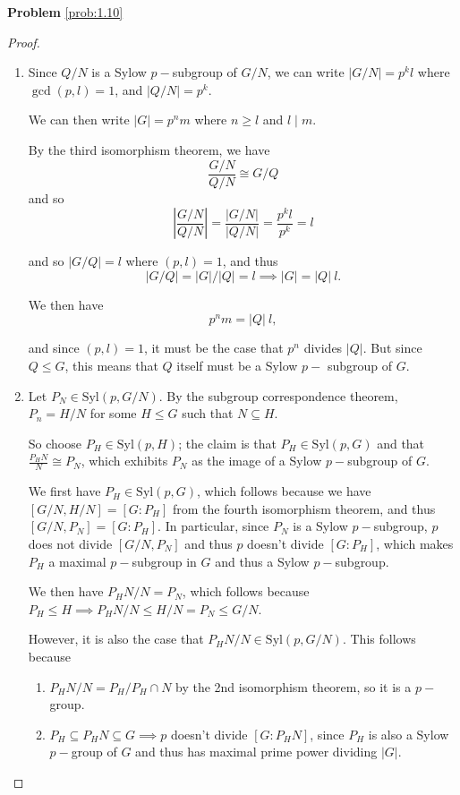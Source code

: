 \textbf{Problem} \ref{prob:1.10}
\begin{proof}\hfill
\begin{enumerate}
    \item Since $Q/N$ is a Sylow $p-$subgroup of $G/N$, we can write $|G/N| = p^k l$ where $\gcd(p, l) = 1$, and $|Q/N| = p^k$.
    
    We can then write $|G| = p^n m$ where $n\geq l$ and $l\mid m$.
    
    By the third isomorphism theorem, we have
    \[
    \frac{G/N}{Q/N} \cong G/Q
    \]
    and so 
    \[
    \left| \frac{G/N}{Q/N} \right| = \frac{|G/N|}{|Q/N|} = \frac{p^k l}{p^k} = l
    \]
    
    and so $|G/Q| = l$ where $(p, l) = 1$, and thus
    \[
    |G/Q| = |G| / |Q| = l \implies |G| = |Q|~l.
    \]
    
    We then have
    \[
    p^n m = |Q|~l,
    \]
    
    and since $(p, l) = 1$, it must be the case that $p^n$ divides $|Q|$. But since $Q \leq G$, this means that $Q$ itself must be a Sylow $p-$ subgroup of $G$.
    
    \item Let $P_N \in \mathrm{Syl}(p, G/N)$. By the subgroup correspondence theorem, $P_n = H/N$ for some $H\leq G$ such that $N \subseteq H$.
    
    So choose $P_H \in \mathrm{Syl}(p, H)$; the claim is that $P_H \in \mathrm{Syl}(p, G)$ and that $\frac{P_HN}{N} \cong P_N$, which exhibits $P_N$ as the image of a Sylow $p-$subgroup of $G$.
    
    We first have $P_H \in \mathrm{Syl}(p, G)$, which follows because we have $[G/N, H/N] = [G: P_H]$ from the fourth isomorphism theorem, and thus $[G/N, P_N] = [G : P_H]$. In particular, since $P_N$ is a Sylow $p-$subgroup, $p$ does not divide $[G/N, P_N]$ and thus $p$ doesn't divide $[G: P_H]$, which makes $P_H$ a maximal $p-$subgroup in $G$ and thus a Sylow $p-$subgroup.
    
    We then have $P_HN/N = P_N$, which follows because $P_H \leq H \implies P_HN/N \leq H/N = P_N \leq G/N$. 
    
    However, it is also the case that $P_HN/N \in \mathrm{Syl}(p, G/N)$. This follows because 
    \begin{enumerate}
        \item $P_HN/N = P_H/P_H \cap N$ by the 2nd isomorphism theorem, so it is a $p-$group.
        
        \item $P_H \subseteq P_HN \subseteq G \implies p$ doesn't divide $[G: P_HN]$, since $P_H$ is also a Sylow $p-$group of $G$ and thus has maximal prime power dividing $\left| G \right|$.
        

\end{enumerate}
\end{enumerate}
\end{proof}
